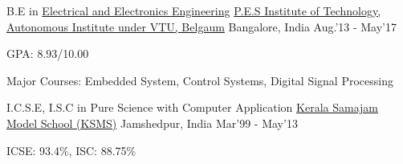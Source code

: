 \begin{cventries}
	\cventry
	{B.E in \href{https://eee.pes.edu/}{Electrical and Electronics Engineering}}
	{\href{https://pesit.pes.edu/}{P.E.S Institute of Technology, Autonomous Institute under VTU, Belgaum}}
	{Bangalore, India}
	{Aug.'13 - May'17}
	{
		\begin{cvitems}
		\item{GPA: 8.93/10.00}
		\item{Major Courses: Embedded System, Control Systems, Digital Signal Processing}
		\end{cvitems}
	}
\end{cventries}

\begin{cventries}
	\cventry
	{I.C.S.E, I.S.C in {Pure Science with Computer Application}}
	{\href{https://ksms.ac.in/}{Kerala Samajam Model School (KSMS)}}
	{Jamshedpur, India}
	{Mar'99 - May'13}
	{
		\begin{cvitems}
		\item{ICSE: 93.4\%, ISC: 88.75\%}
		\end{cvitems}
	}
\end{cventries}
